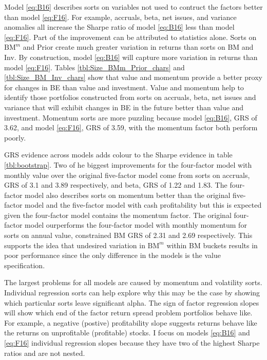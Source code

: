 Model \ref{eq:B16} describes sorts on
variables not used to contruct the factors better than model \ref{eq:F16}.
For example, accruals, beta, net issues, and variance anomalies all
increase the Sharpe ratio of model \ref{eq:B16} less than model \ref{eq:F16}.
Part of the improvement can be attributed to statistics alone.
Sorts on $\text{BM}^m$ and Prior create much greater variation in returns than
sorts on BM and Inv.
By construction, model \ref{eq:B16} will capture more variation in returns than
model \ref{eq:F16}.
Tables \ref{tbl:Size_BMm_Prior_chars} and \ref{tbl:Size_BM_Inv_chars} show that
value and momentum provide a better proxy for changes in BE than value and
investment.
Value and momentum help to identify those portfolios constructed from sorts on
accruals, beta, net issues and variance that will exhibit changes in BE in the
future better than value and investment.
Momentum sorts are more puzzling because model \ref{eq:B16}, GRS of 3.62,
and model \ref{eq:F16}, GRS of 3.59, with the momentum factor both perform
poorly.

GRS evidence across models adds colour to the Sharpe evidence in table
\ref{tbl:bootstrap}.
Two of he biggest improvements for the four-factor model with monthly value
over the original five-factor model come from sorts on accruals,
GRS of 3.1 and 3.89 respectively, and beta, GRS of 1.22 and 1.83.
The four-factor model also describes sorts on momentum better than the original
five-factor model and the five-factor model with cash profitability but this is
expected given the four-factor model contains the momentum factor.
The original four-factor model ourperforms the four-factor model with monthly
momentum for sorts on annual value, constrained BM GRS of 2.31 and 2.69
respectively.
This supports the idea that undesired variation in $\text{BM}^m$ within BM
buckets results in poor performance since the only difference in the models is
the value specification.

The largest problems for all models are caused by momentum and volatility
sorts.
Individual regression sorts can help explore why this may be the case by
showing which particular sorts leave significant alpha.
The sign of factor regression slopes will show which end of the factor return
spread problem portfolios behave like.
For example, a negative (postive) profitability slope suggests returns behave
like the returns on unprofitable (profitable) stocks.
I focus on models \ref{eq:B16} and \ref{eq:F16} individual regression slopes
because they have two of the highest Sharpe ratios and are not nested.


